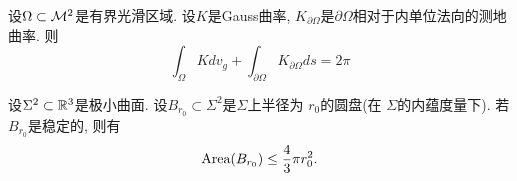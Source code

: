 \begin{theorem}
    设$\Omega \subset {\mathcal{M}}^2$是有界光滑区域. 设$K$是Gauss曲率, $K_{\partial \Omega}$是$\partial \Omega$相对于内单位法向的测地曲率. 则
    \begin{equation}
        \int_{\Omega} K dv_g +\int_{\partial \Omega} K_{\partial \Omega} ds=2 \pi
    \end{equation}
\end{theorem}
\begin{proposition} \label{mc_area}
    设$\Sigma^2 \subset {\mathbb{R}}^3$是极小曲面. 设$B_{r_0} \subset \Sigma^2$是$\Sigma$上半径为 $r_0$的圆盘(在 $\Sigma$的内蕴度量下). 若$B_{r_0}$是稳定的, 则有
    \begin{equation}
        \text{Area}(B_{r_0}) \le \frac{4}{3}\pi r_0^2.
    \end{equation}
\end{proposition}
